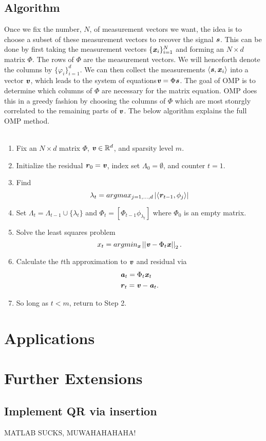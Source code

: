 \documentclass[12pt]{amsart}
\theoremstyle{plain}
\theoremstyle{plain}
\theoremstyle{plain}
\theoremstyle{plain}
\theoremstyle{plain}
\theoremstyle{plain}
\theoremstyle{plain}
\theoremstyle{plain}
\newcommand{\R}{\mathbb{R}}
\newcommand{\s}{\textbf{\emph{s}}}
\newcommand{\x}{\textbf{\emph{x}}}
\newcommand{\ve}{\textbf{\emph{v}}}
\newcommand{\arr}{\textbf{\emph{r}}}
\newcommand{\ay}{\textbf{\emph{a}}}
\newcommand{\vectornorm}[1]{\left|\left|#1\right|\right|}
\begin{document}
	
\subsection{Algorithm}

Once we fix the number, $N$, of measurement vectors we want, the idea is to choose a subset of these measurement vectors to recover the signal $\s$.  This can be done by first taking the measurement vectors $\{\x_i\}_{i=1}^N$ and forming an $N\times d$ matrix $\Phi$.  The rows of $\Phi$ are the measurement vectors.  We will henceforth denote the columns by $\{\varphi_i\}_{i=1}^d$.  We can then collect the measurements $\langle \s,\x_i\rangle$ into a vector $\ve$, which leads to the system of equations$\ve=\Phi \s$.  The goal of OMP is to determine which columns of $\Phi$ are necessary for the matrix equation.  OMP does this in a greedy fashion by choosing the columns of $\Phi$ which are most stonrgly correlated to the remaining parts of $\ve$.  The below algorithm explains the full OMP method.\\\\

\begin{enumerate}
	\item Fix an $N\times d$ matrix $\Phi$, $\ve\in\R^d$, and sparsity level $m$.
	\item Initialize the residual $\arr_0=\ve$, index set $\Lambda_0=\emptyset$, and counter $t=1$.
	\item Find 
		$$\lambda_t=argmax_{j=1,\ldots, d} \left|\langle \arr_{t-1},\phi_j\rangle\right|$$
	\item Set $\Lambda_t=\Lambda_{t-1}\cup\{\lambda_t\}$ and $\Phi_t = [\Phi_{t-1} \phi_{\lambda_t}]$ where $\Phi_0$ is an empty matrix.
	\item Solve the least squares problem 
		$$x_t=argmin_\x \vectornorm{\ve-\Phi_t\x}_2.$$
	\item Calculate the $t$th approximation to $\ve$ and residual via
		\begin{align*}
			&\ay_t=\Phi_t\x_t\\
			&\arr_t=\ve-\ay_t.
		\end{align*}
	\item So long as $t<m$, return to Step 2.
\end{enumerate}

\section{Applications}

\section{Further Extensions}
\subsection{Implement QR via insertion}
MATLAB SUCKS, MUWAHAHAHAHA!
\end{document}
